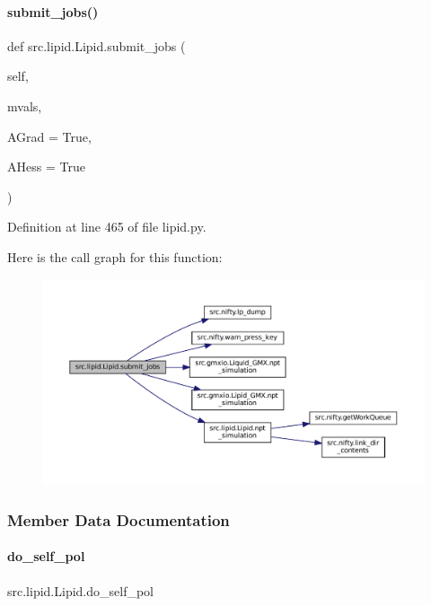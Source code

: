 \paragraph{\texorpdfstring{submit\+\_\+jobs()}{submit\_jobs()}}
{\footnotesize\ttfamily def src.\+lipid.\+Lipid.\+submit\+\_\+jobs (\begin{DoxyParamCaption}\item[{}]{self,  }\item[{}]{mvals,  }\item[{}]{A\+Grad = {\ttfamily True},  }\item[{}]{A\+Hess = {\ttfamily True} }\end{DoxyParamCaption})}



Definition at line 465 of file lipid.\+py.

Here is the call graph for this function\+:
\nopagebreak
\begin{figure}[H]
\begin{center}
\leavevmode
\includegraphics[width=350pt]{classsrc_1_1lipid_1_1Lipid_add85e5fe4603baf97f3f2d0ef2647d0e_cgraph}
\end{center}
\end{figure}


\subsubsection{Member Data Documentation}
\mbox{\label{classsrc_1_1lipid_1_1Lipid_aeaca091353262fa28170883792b04460}} 
\paragraph{\texorpdfstring{do\+\_\+self\+\_\+pol}{do\_self\_pol}}
{\footnotesize\ttfamily src.\+lipid.\+Lipid.\+do\+\_\+self\+\_\+pol}



